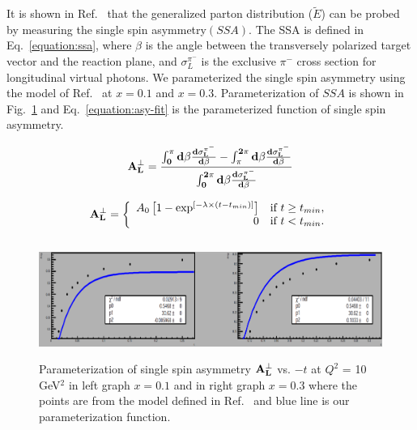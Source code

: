 It is shown in Ref.~\cite{frankfurt} that the generalized parton distribution
($\tilde{E}$) can be probed by measuring the single spin asymmetry$(SSA)$. The
SSA is defined in Eq.~\ref{equation:ssa}, where $\beta$ is the angle between
the transversely polarized target vector and the reaction plane, and
$\sigma_{L}^{\pi^{-}}$ is the exclusive $\pi^{-}$ cross section for
longitudinal virtual photons.  We parameterized the single spin asymmetry using
the model of Ref.~\cite{frankfurt} at $x = 0.1$ and $x = 0.3$. Parameterization
of $SSA$ is shown in Fig.~\ref{fig:asym-1} and Eq.~\ref{equation:asy-fit} is
the parameterized function of single spin asymmetry.

\begin{equation}
  \bf{A_{L}^{\perp}} =
  \frac{\int^{\pi}_{0}d\beta\frac{d\sigma_{L}^{\pi^{-}}}{d\beta} -
    \int^{2\pi}_{\pi}d\beta\frac{d\sigma_{L}^{\pi^{-}}}{d\beta} }
       {\int^{2\pi}_{0}d\beta\frac{d\sigma_{L}^{\pi^{-}}}{d\beta}}
     \label{equation:ssa}
\end{equation}

\begin{equation}
        \bf{A_{L}^{\perp}} = \left\{
        \begin{array}{rl}
        A_{0} \left[ 1 - \exp^{ [ -\lambda \times ( t - t_{min} ) ] } \right] &
        \text{if } t \ge t_{min}, \\ 0 & \text{if } t < t_{min}.
        \end{array} \right.
     \label{equation:asy-fit}
\end{equation}

\begin{figure}[!hbt]
    \centering
    \includegraphics[width=6.0in,height=1.5in]{./figures/asym_3.pdf}
    \caption{ Parameterization of single spin asymmetry $\bf{A_{L}^{\perp}}$
      vs. $-t$ at $Q^2$ = 10 GeV$^2$ in left graph $x = 0.1$ and in right graph
      $x = 0.3$ where the points are from the model defined in
      Ref.~\cite{frankfurt} and blue line is our parameterization function.}
    \label{fig:asym-1}
\end{figure}
